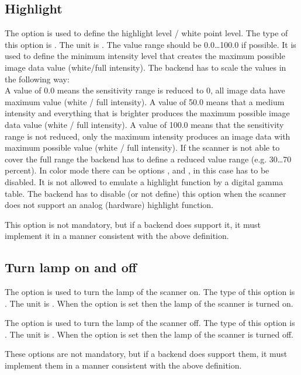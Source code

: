 \documentclass[11pt,DVIps]{report}
\begin{document}
\subsection{Highlight}
\begin{changebar}
The option  is used to define the highlight level / white point level.
The type of this option is .
The unit is . The value range
should be 0.0\ldots100.0 if possible.
It is used to define the minimum intensity level that creates the maximum possible
image data value (white/full intensity).  The backend has to scale the values in the
following way:\\
A value of 0.0 means the sensitivity range is reduced to 0, all image
data have maximum value (white / full intensity).
A value of 50.0 means that a medium intensity and everything that is brighter
produces the maximum possible image data value (white / full intensity).
A value of 100.0 means that the sensitivity range is not reduced, only the
maximum intensity produces an image data with maximum possible value (white / full intensity).
If  the scanner is not able to cover the full range the backend has to define a reduced
value range (e.g. 30\ldots70 percent).
In color mode there can be options , 
and , in this case  has to be disabled.
It is not allowed to emulate a highlight function by
a digital gamma table. The backend has to disable (or not
define) this option when the scanner does not support an
analog (hardware) highlight function.

This option is not mandatory, but if a backend does support it, it
must implement it in a manner consistent with the above definition.\\
\end{changebar}


\subsection{Turn lamp on and off}
\begin{changebar}
The option  is used to turn the lamp of the scanner on.
The type of this option is .
The unit is . When the option is set
then the lamp of the scanner is turned on.

The option  is used to turn the lamp of the scanner off.
The type of this option is .
The unit is . When the option is set
then the lamp of the scanner is turned off.

These options are not mandatory, but if a backend does support them, it
must implement them in a manner consistent with the above definition.\\
\end{changebar}
\end{document}
